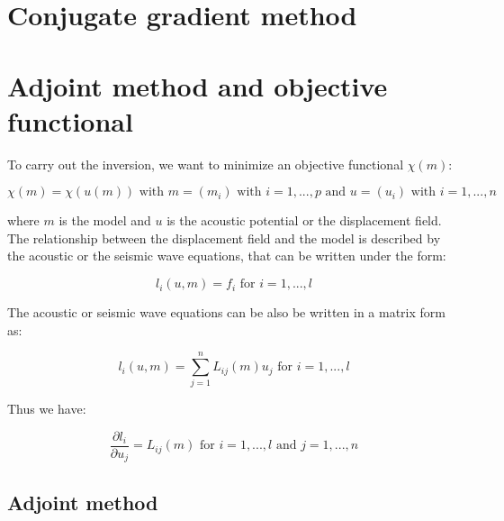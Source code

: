 \documentclass{article}
\begin{document}
\section{Conjugate gradient method}

\section{Adjoint method and objective functional}

To carry out the inversion, we want to minimize an objective functional $\chi (m)$:

\begin{equation}
	\chi (m) = \chi (u(m)) \text{ with } m = (m_i) \text{ with } i = 1, ... , p \text{ and } u = (u_i) \text{ with } i = 1, ... , n
\end{equation}

where $m$ is the model and $u$ is the acoustic potential or the displacement field. The relationship between the displacement field and the model is described by the acoustic or the seismic wave equations, that can be written under the form:

\begin{equation}
	l_i (u, m) = f_i \text{ for } i = 1, ... , l
\end{equation}

The acoustic or seismic wave equations can be also be written in a matrix form as:

\begin{equation}
	l_i (u, m) = \sum_{j = 1}^{n} L_{ij} (m) u_j \text{ for } i = 1, ... , l
\end{equation}

Thus we have:

\begin{equation}
	\frac{\partial l_i}{\partial u_j} = L_{ij} (m) \text{ for } i = 1 , ... , l \text{ and } j = 1, ... , n
\end{equation}

\subsection{Adjoint method}
\end{document}
